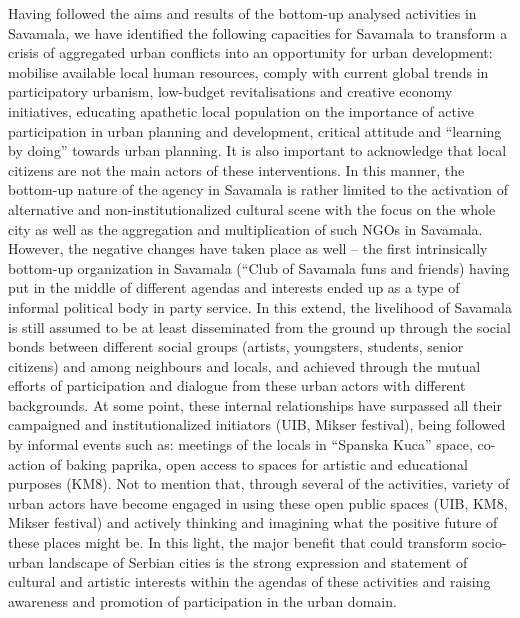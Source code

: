 \documentclass[11pt]{report}
\begin{document}
Having followed the aims and results of the bottom-up analysed activities in Savamala, we have identified the following capacities for Savamala to transform a crisis of aggregated urban conflicts into an opportunity for urban development: mobilise available local human resources, comply with current global trends in participatory urbanism, low-budget revitalisations and creative economy initiatives, educating apathetic local population on the importance of active participation in urban planning and development, critical attitude and “learning by doing” towards urban planning. It is also important to acknowledge that local citizens are not the main actors of these interventions. In this manner, the bottom-up  nature of the agency in Savamala is rather limited to the activation of alternative and non-institutionalized cultural scene with the focus on the whole city as well as the aggregation and multiplication of such NGOs in Savamala. However, the negative changes have taken place as well – the first intrinsically bottom-up organization in Savamala (“Club of Savamala funs and friends) having put in the middle of different agendas and interests ended up as a type of informal political body in party service.
In this extend, the livelihood of Savamala is still assumed to be at least disseminated from the ground up through the social bonds between different social groups (artists, youngsters, students, senior citizens) and among neighbours and locals, and achieved through the mutual efforts of participation and dialogue from these urban actors with different backgrounds. At some point, these internal relationships have surpassed all their campaigned and institutionalized initiators (UIB, Mikser festival), being followed by informal events such as: meetings of the locals in “Spanska Kuca” space, co-action of baking paprika, open access to spaces for artistic and educational purposes (KM8). Not to mention that, through several of the activities, variety of urban actors have become engaged in using these open public spaces (UIB, KM8, Mikser festival) and actively thinking and imagining what the positive future of these places might be. In this light, the major benefit that could transform socio-urban landscape of Serbian cities is the strong expression and statement of cultural and artistic interests within the agendas of these activities and raising awareness and promotion of participation in the urban domain.
\end{document}
